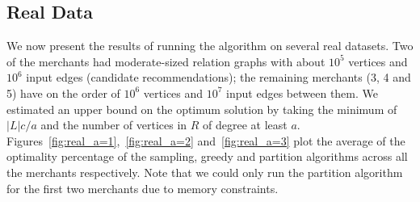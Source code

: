 \subsection{Real Data}
We now present the results of running the algorithm on several real
datasets. Two of the merchants had moderate-sized relation graphs with
about $10^5$ vertices and $10^6$ input edges (candidate
recommendations); the remaining merchants (3, 4 and 5) have on the
order of $10^6$ vertices and $10^7$ input edges between them. 
We estimated an upper bound on the optimum solution by taking the minimum of
$|L|c/a$ and the number of vertices in $R$ of degree at least
$a$. Figures~\ref{fig:real_a=1},~\ref{fig:real_a=2}
and~\ref{fig:real_a=3} plot the average of the optimality
percentage of the sampling, greedy and partition algorithms across all
the merchants respectively. Note that we could only run the partition
algorithm for the first two merchants due to memory constraints. \vs

